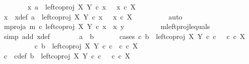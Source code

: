 \begin{isabellebody}
\ \ \ \ \ \ \isamarkupfalse%
\ {\isachardoublequoteopen}{\isasymexists}x{\isachardot}{\kern0pt}\ a\ {\isacharequal}{\kern0pt}\ left{\isacharunderscore}{\kern0pt}coproj\ X\ Y\ {\isasymcirc}\isactrlsub c\ x\ \ {\isasymand}\ x\ {\isasymin}\isactrlsub c\ X{\isachardoublequoteclose}\isanewline
\ \ \ \ \ \ \isamarkupfalse%
\ \isamarkupfalse%
\ x\ \ x{\isacharunderscore}{\kern0pt}def{\isacharcolon}{\kern0pt}\ {\isachardoublequoteopen}a\ {\isacharequal}{\kern0pt}\ left{\isacharunderscore}{\kern0pt}coproj\ X\ Y\ {\isasymcirc}\isactrlsub c\ x\ \ {\isasymand}\ x\ {\isasymin}\isactrlsub c\ X{\isachardoublequoteclose}\isanewline
\ \ \ \ \ \ \ \ \isamarkupfalse%
\ auto\isanewline
\ \ \ \ \ \ \isamarkupfalse%
\ \isamarkupfalse%
\ m{\isacharunderscore}{\kern0pt}proj{\isacharunderscore}{\kern0pt}a{\isacharcolon}{\kern0pt}\ {\isachardoublequoteopen}m\ {\isasymcirc}\isactrlsub c\ left{\isacharunderscore}{\kern0pt}coproj\ X\ Y\ {\isasymcirc}\isactrlsub c\ x\ {\isacharequal}{\kern0pt}\ {\isasymlangle}x{\isacharcomma}{\kern0pt}\ y{}{\isasymrangle}{\isachardoublequoteclose}\isanewline
\ \ \ \ \ \ \ \ \isamarkupfalse%
\ m{\isacharunderscore}{\kern0pt}leftproj{\isacharunderscore}{\kern0pt}l{\isacharunderscore}{\kern0pt}equals\ \isamarkupfalse%
\ {\isacharparenleft}{\kern0pt}simp\ add{\isacharcolon}{\kern0pt}\ x{\isacharunderscore}{\kern0pt}def{\isacharparenright}{\kern0pt}\isanewline
\ \ \ \ \ \ \isamarkupfalse%
\ {\isachardoublequoteopen}a\ {\isacharequal}{\kern0pt}\ b{\isachardoublequoteclose}\isanewline
\ \ \ \ \ \ \isamarkupfalse%
{\isacharparenleft}{\kern0pt}cases\ {\isachardoublequoteopen}{\isasymexists}c{\isachardot}{\kern0pt}\ b\ {\isacharequal}{\kern0pt}\ left{\isacharunderscore}{\kern0pt}coproj\ X\ Y\ {\isasymcirc}\isactrlsub c\ c\ \ {\isasymand}\ c\ {\isasymin}\isactrlsub c\ X{\isachardoublequoteclose}{\isacharparenright}{\kern0pt}\isanewline
\ \ \ \ \ \ \ \ \isamarkupfalse%
\ {\isachardoublequoteopen}{\isasymexists}c{\isachardot}{\kern0pt}\ b\ {\isacharequal}{\kern0pt}\ left{\isacharunderscore}{\kern0pt}coproj\ X\ Y\ {\isasymcirc}\isactrlsub c\ c\ {\isasymand}\ c\ {\isasymin}\isactrlsub c\ X{\isachardoublequoteclose}\isanewline
\ \ \ \ \ \ \ \ \isamarkupfalse%
\ \isamarkupfalse%
\ c\ \ c{\isacharunderscore}{\kern0pt}def{\isacharcolon}{\kern0pt}\ {\isachardoublequoteopen}b\ {\isacharequal}{\kern0pt}\ left{\isacharunderscore}{\kern0pt}coproj\ X\ Y\ {\isasymcirc}\isactrlsub c\ c\ \ {\isasymand}\ c\ {\isasymin}\isactrlsub c\ X{\isachardoublequoteclose}\isanewline

\end{isabellebody}
